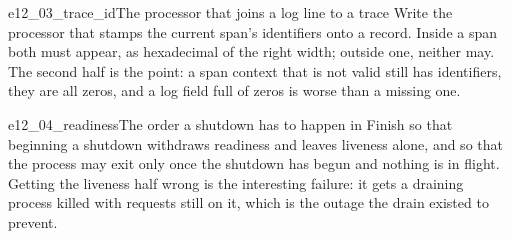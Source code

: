 \begin{exercise}{e12_03_trace_id}{The processor that joins a log line to a trace}
Write the processor that stamps the current span's identifiers onto a
record. Inside a span both must appear, as hexadecimal of the right width;
outside one, neither may. The second half is the point: a span context
that is not valid still has identifiers, they are all zeros, and a log
field full of zeros is worse than a missing one.
\end{exercise}

\begin{exercise}{e12_04_readiness}{The order a shutdown has to happen in}
Finish  so that beginning a shutdown withdraws readiness
and leaves liveness alone, and so that the process may exit only once the
shutdown has begun and nothing is in flight. Getting the liveness half
wrong is the interesting failure: it gets a draining process killed with
requests still on it, which is the outage the drain existed to prevent.
\end{exercise}
